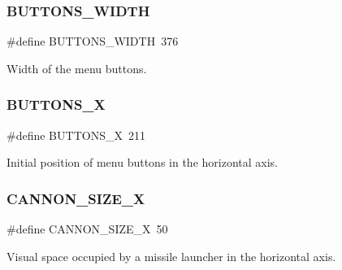 \subsubsection{\texorpdfstring{B\+U\+T\+T\+O\+N\+S\+\_\+\+W\+I\+D\+TH}{BUTTONS\_WIDTH}}
{\footnotesize\ttfamily \#define B\+U\+T\+T\+O\+N\+S\+\_\+\+W\+I\+D\+TH~376}



Width of the menu buttons. 

\hypertarget{group___b_m_ps_holder_ga3d387db7d44e83471b3a63d94ab7a5b9}{}\label{group___b_m_ps_holder_ga3d387db7d44e83471b3a63d94ab7a5b9} 
\subsubsection{\texorpdfstring{B\+U\+T\+T\+O\+N\+S\+\_\+X}{BUTTONS\_X}}
{\footnotesize\ttfamily \#define B\+U\+T\+T\+O\+N\+S\+\_\+X~211}



Initial position of menu buttons in the horizontal axis. 

\hypertarget{group___b_m_ps_holder_gac6a06e6bc22a5b60c419594300c1749f}{}\label{group___b_m_ps_holder_gac6a06e6bc22a5b60c419594300c1749f} 
\subsubsection{\texorpdfstring{C\+A\+N\+N\+O\+N\+\_\+\+S\+I\+Z\+E\+\_\+X}{CANNON\_SIZE\_X}}
{\footnotesize\ttfamily \#define C\+A\+N\+N\+O\+N\+\_\+\+S\+I\+Z\+E\+\_\+X~50}



Visual space occupied by a missile launcher in the horizontal axis. 

\hypertarget{group___b_m_ps_holder_gad3b9eb80fe60bc8f7530633439fa9b25}{}\label{group___b_m_ps_holder_gad3b9eb80fe60bc8f7530633439fa9b25} 
